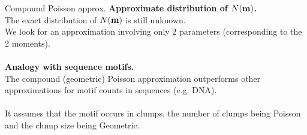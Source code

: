 \documentclass[pdf,mia,noFooter,slideColor,colorBG]{prosper}
\newcommand{\emphase}[1]{{\textcolor{blue}{{#1}}}}
\renewcommand{\paragraph}[1]{{\large \bf  #1}}
\begin{document}

\begin{slide}{Compound Poisson approx.}
  \paragraph{Approximate distribution of $N({\bf m})$.} ~\\
  The exact distribution of $N({\bf m})$ is still unknown. \\
  We look for an approximation involving only 2 parameters
  (corresponding to the 2 moments). \\
  ~\\
  \paragraph{Analogy with sequence motifs.} ~\\
  The compound (geometric) Poisson approximation outperforms other
  approximations for motif counts in sequences (e.g. DNA). \\ ~\\
  It assumes that the motif occurs in clumps, the number of clumps
  being Poisson and the clump size being Geometric.
  
\end{slide}
\end{document}
